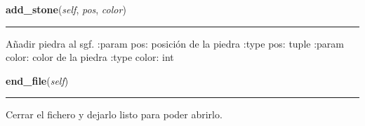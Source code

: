     \label{src:kifu:Kifu:add_stone}

    \vspace{0.5ex}

\hspace{.8\funcindent}\begin{boxedminipage}{\funcwidth}

    \raggedright \textbf{add\_stone}(\textit{self}, \textit{pos}, \textit{color})

    \vspace{-1.5ex}

    \rule{\textwidth}{0.5\fboxrule}
\setlength{\parskip}{2ex}
    Añadir piedra al sgf. :param pos: posición de la piedra :type pos: 
    tuple :param color: color de la piedra :type color: int

\setlength{\parskip}{1ex}
    \end{boxedminipage}

    \label{src:kifu:Kifu:end_file}

    \vspace{0.5ex}

\hspace{.8\funcindent}\begin{boxedminipage}{\funcwidth}

    \raggedright \textbf{end\_file}(\textit{self})

    \vspace{-1.5ex}

    \rule{\textwidth}{0.5\fboxrule}
\setlength{\parskip}{2ex}
    Cerrar el fichero y dejarlo listo para poder abrirlo.

\setlength{\parskip}{1ex}
    \end{boxedminipage}


